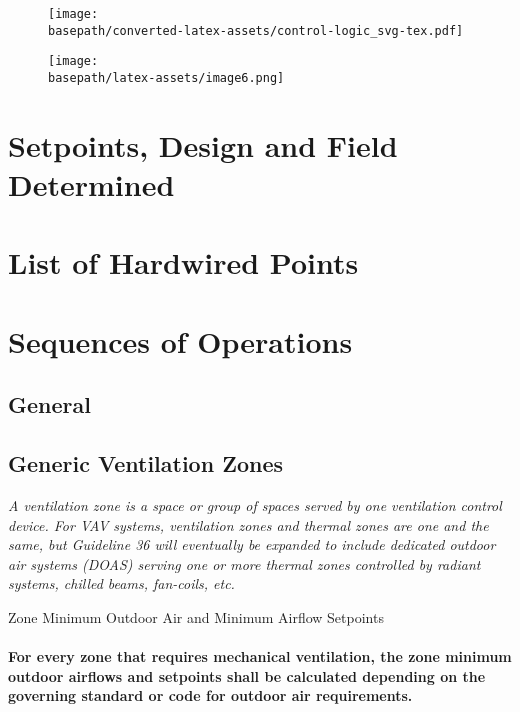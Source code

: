 \documentclass[10pt]{article}
\providecommand{\basepath}{/Users/yves/Projects/lbnl/LBL-Linkage-Widget-v2/server/src/sequence}
\begin{document}
\begin{figure}[h]
  \texttt{[image: \\basepath/converted-latex-assets/control-logic\_svg-tex.pdf]}
\end{figure}

\begin{figure}[h]
  \texttt{[image: \\basepath/latex-assets/image6.png]}
\end{figure}

\ifdefined\BuildingsTemplatesAirHandlersFansInterfacesPartialAirHandlertypFanRet
\fi

\section{Setpoints, Design and Field Determined}
\section{List of Hardwired Points}
\section{Sequences of Operations}

\subsection{General}

\subsection{Generic Ventilation Zones}

\textit{A ventilation zone is a space or group of spaces served by one ventilation control device. For VAV systems, ventilation zones and thermal zones are one and the same, but Guideline 36 will eventually be expanded to include dedicated outdoor air systems (DOAS) serving one or more thermal zones controlled by radiant systems, chilled beams, fan-coils, etc.}

Zone Minimum Outdoor Air and Minimum Airflow Setpoints

\paragraph{For every zone that requires mechanical ventilation, the zone minimum outdoor airflows and setpoints shall be calculated depending on the governing standard or code for outdoor air requirements.}
\end{document}
